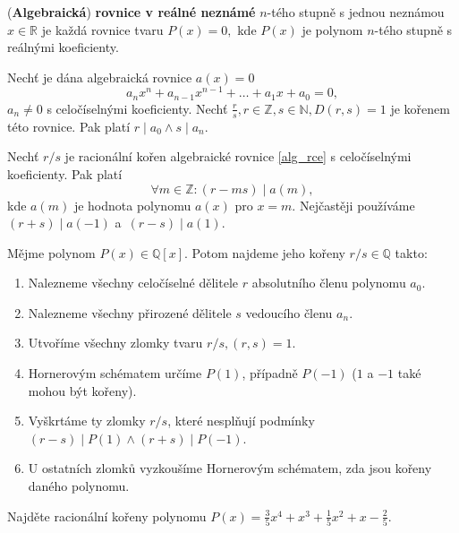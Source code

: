 \begin{definition}
(\textbf{Algebraická}) \textbf{rovnice v reálné neznámé} $n$-tého stupně s jednou neznámou $x\in \mathbb R$ je každá
rovnice tvaru $P(x)=0,$ kde $P(x)$ je polynom $n$-tého stupně s reálnými koeficienty.
\end{definition}

\begin{veta}
    Nechť je dána algebraická rovnice $a(x)=0$
    \begin{equation}\label{alg_rce}
        a_nx^n + a_{n-1}x^{n-1}+\dots + a_1x+a_0=0,
    \end{equation}
    $a_n \ne 0$ s celočíselnými koeficienty. Nechť $\frac{r}{s}, r\in \mathbb Z, s \in \mathbb N, D(r,s)=1$ je kořenem této rovnice.
    Pak platí $r \mid a_0 \land s \mid a_n$.
\end{veta}

\begin{veta}\label{odecitanivpolynomu}
    Nechť $r/s$ je racionální kořen algebraické rovnice \ref{alg_rce} s celočíselnými koeficienty.
    Pak platí
    $$\forall m \in \mathbb Z\colon (r-ms) \mid a(m),$$
    kde $a(m)$ je hodnota polynomu $a(x)$ pro $x=m.$ Nejčastěji používáme $(r + s) \mid a(-1)$ a~$(r - s) \mid a(1).$
\end{veta}

\begin{algoritmus}
  Mějme polynom $P(x) \in \mathbb Q [x]$. Potom najdeme jeho kořeny $r/s \in \mathbb Q$ takto:
  \begin{enumerate}[1.]
    \item Nalezneme všechny celočíselné dělitele $r$ absolutního členu polynomu $a_0$.
    \item Nalezneme všechny přirozené dělitele $s$ vedoucího členu $a_n$.
    \item Utvoříme všechny zlomky tvaru $r/s, (r,s) = 1$.
    \item Hornerovým schématem určíme $P(1)$, případně $P(-1)$ ($1$ a $-1$ také mohou být kořeny).
    \item Vyškrtáme ty zlomky $r/s$, které nesplňují podmínky $(r-s) \mid P(1) \land (r+s) \mid P(-1)$.
    \item U ostatních zlomků vyzkoušíme Hornerovým schématem, zda jsou kořeny daného polynomu.
  \end{enumerate}
\end{algoritmus}

\begin{priklad}
Najděte racionální kořeny polynomu $P(x)=\frac{3}{5}x^4+x^3+\frac{1}{5}x^2+x-\frac{2}{5}.$
\end{priklad}

